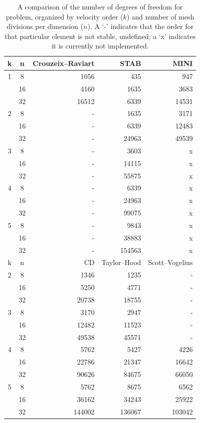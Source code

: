 \begin{table}
  \center
  \medskip
  \small
  \begin{tabular}{|cc|rrr|}
    \hline
    k & n & Crouzeix--Raviart &  STAB & MINI \\
    \hline
    1&  8 &   1056 &   435 & 947  \\
      & 16 &   4160 & 1635 & 3683 \\
      & 32 & 16512 & 6339 & 14531 \\
    \hline
    2 &  8 & - &     1635 & 3171 \\
       & 16 & - &    6339 &  12483 \\
       & 32 & - &  24963 & 49539 \\
    \hline
    3 &  8 & - &    3603 & x \\
       & 16 & - & 14115 & x \\
       & 32 & - & 55875 & x \\
    \hline
    4 &  8 & - &    6339 & x \\
       & 16 & - & 24963 & x \\
       & 32 & - & 99075 & x \\
    \hline
    5 &  8 & - &      9843 &  x \\
       & 16 & - &   38883 &  x \\
       & 32 & - & 154563 & x \\
    \hline
    \hline
    k & n & CD & Taylor--Hood & Scott--Vogelius \\
    \hline
    2 &  8 &  1346 &   1235 & - \\
       & 16 &  5250 &   4771 & - \\
       & 32 & 20738& 18755 & - \\
    \hline
    3 &  8 &   3170 &   2947 & - \\
       & 16 & 12482 & 11523 & - \\
       & 32 & 49538 & 45571 & - \\
    \hline
    4 &  8 &   5762 &    5427 &   4226 \\
       & 16 & 22786 &  21347 & 16642 \\
       & 32 & 90626 &  84675 & 66050 \\
    \hline
    5 &  8 &      5762 &     8675 &     6562 \\
       & 16 &   36162 &   34243 &   25922 \\
       & 32 & 144002 & 136067 & 103042 \\
    \hline
\end{tabular}
  \caption{A comparison of the number of degrees of freedom for problem,
  organized by velocity order ($k$) and number of mesh divisions
  per dimension ($n$). A `-' indicates that the order for that particular
  element is not stable, undefined; a `x' indicates it is currently
  not implemented.}
  \label{tab:terrel:DOFs}
\end{table}

